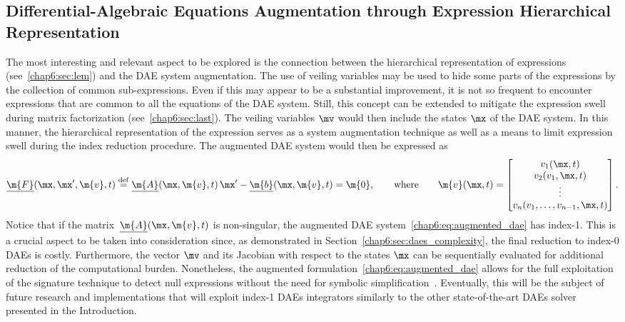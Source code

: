 \subsection{Differential-Algebraic Equations Augmentation through Expression Hierarchical Representation}

The most interesting and relevant aspect to be explored is the connection between the hierarchical representation of expressions (see~\ref{chap6:sec:lem}) and the \ac{DAE} system augmentation. The use of veiling variables may be used to hide some parts of the expressions by the collection of common sub-expressions. Even if this may appear to be a substantial improvement, it is not so frequent to encounter expressions that are common to all the equations of the \ac{DAE} system. Still, this concept can be extended to mitigate the expression swell during matrix factorization (see~\ref{chap6:sec:last}). The veiling variables $\mv$ would then include the states $\mx$ of the \ac{DAE} system. In this manner, the hierarchical representation of the expression serves as a system augmentation technique as well as a means to limit expression swell during the index reduction procedure. The augmented \ac{DAE} system would then be expressed as
%
\begin{equation}
  \label{chap6:eq:augmented_dae}
  \underline{\m{F}}(\mx, \mx^\prime, \m{v}, t) \overset{\mathrm{def}}{=} \underline{\m{A}}(\mx, \m{v}, t) \, \mx^\prime - \underline{\m{b}}(\mx, \m{v}, t) = \m{0},
  \qquad \text{where} \qquad
  \m{v}(\mx, t) = \begin{bmatrix}
    v_{1}(\mx, t) \\
    v_{2}(v_{1}, \mx, t) \\
    \vdots \\
    v_{n}(v_{1}, \dots, v_{n-1}, \mx, t) \\
  \end{bmatrix}.
\end{equation}
%
Notice that if the matrix $\,\underline{\m{A}}(\mx, \m{v}, t)$ is non-singular, the augmented \ac{DAE} system~\eqref{chap6:eq:augmented_dae} has index-1. This is a crucial aspect to be taken into consideration since, as demonstrated in Section~\ref{chap6:sec:daes_complexity}, the final reduction to index-0 \acp{DAE} is costly. Furthermore, the vector $\mv$ and its Jacobian with respect to the states $\mx$ can be sequentially evaluated for additional reduction of the computational burden. Nonetheless, the augmented formulation~\eqref{chap6:eq:augmented_dae} allows for the full exploitation of the signature technique to detect null expressions without the need for symbolic simplification~\cite{monagan1994signature}. Eventually, this will be the subject of future research and implementations that will exploit index-1 \acp{DAE} integrators similarly to the other state-of-the-art \acp{DAE} solver presented in the Introduction.

